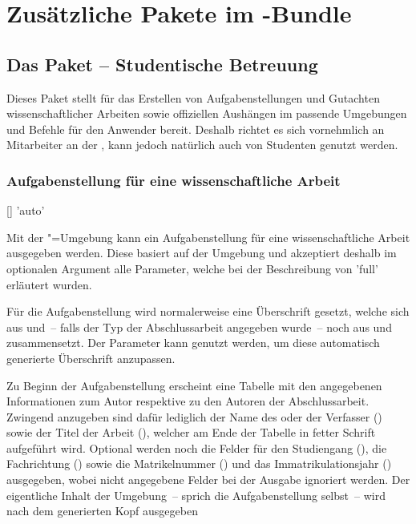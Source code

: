 \chapter{Zusätzliche Pakete im \TUDScript-Bundle}
\label{sec:bundle}%
%
\section{Das Paket  -- Studentische Betreuung}
\begin{Bundle*}{}
%
Dieses Paket stellt für das Erstellen von Aufgabenstellungen und Gutachten 
wissenschaftlicher Arbeiten sowie offiziellen Aushängen im \CD passende 
Umgebungen und Befehle für den Anwender bereit. Deshalb richtet es sich 
vornehmlich an Mitarbeiter an der \TnUD, kann jedoch natürlich auch von 
Studenten genutzt werden.


\subsection{Aufgabenstellung für eine wissenschaftliche Arbeit}
%
%
\begin{Declaration}{[]}{%
  'auto'%
}
\begin{Declaration}{}
\printdeclarationlist%
%
Mit der "=Umgebung kann ein Aufgabenstellung für eine 
wissenschaftliche Arbeit ausgegeben werden. Diese basiert auf der Umgebung 
 und akzeptiert deshalb im optionalen Argument alle 
Parameter, welche bei der Beschreibung von 'full' 
erläutert wurden.

Für die Aufgabenstellung wird normalerweise eine Überschrift gesetzt, welche 
sich aus  und~-- falls der Typ der Abschlussarbeit angegeben 
wurde~-- noch aus  und  zusammensetzt. Der 
Parameter  kann genutzt werden, um diese 
automatisch generierte Überschrift anzupassen.

Zu Beginn der Aufgabenstellung erscheint eine Tabelle mit den angegebenen 
Informationen zum Autor respektive zu den Autoren der Abschlussarbeit. Zwingend 
anzugeben sind dafür lediglich der Name des oder der Verfasser () 
sowie der Titel der Arbeit (), welcher am Ende der Tabelle in 
fetter Schrift aufgeführt wird. Optional werden noch die Felder für den 
Studiengang (), die Fachrichtung () sowie die 
Matrikelnummer () und das Immatrikulationsjahr 
() ausgegeben, wobei nicht angegebene Felder bei der 
Ausgabe ignoriert werden. Der eigentliche Inhalt der Umgebung~-- sprich die 
Aufgabenstellung selbst~-- wird nach dem generierten Kopf ausgegeben


\end{Declaration}
\end{Declaration}
\end{Bundle*}
